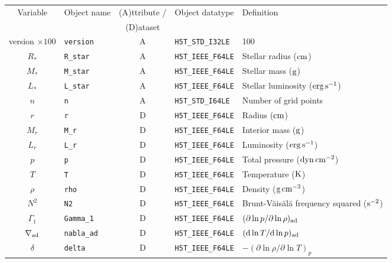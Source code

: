 \documentclass{article}
\newcommand{\diff}{\ensuremath{{\rm d}}}
\newcommand{\Rstar}{\ensuremath{R_{\ast}}}
\newcommand{\Mstar}{\ensuremath{M_{\ast}}}
\newcommand{\Lstar}{\ensuremath{L_{\ast}}}
\newcommand{\cm}{\ensuremath{{\rm cm}}}
\newcommand{\gram}{\ensuremath{{\rm g}}}
\newcommand{\second}{\ensuremath{{\rm s}}}
\newcommand{\dyne}{\ensuremath{{\rm dyn}}}
\newcommand{\erg}{\ensuremath{{\rm erg}}}
\newcommand{\kelvin}{\ensuremath{{\rm K}}}
\begin{document}
\begin{table}[h!]
\begin{tabular}{|c|l|c|l|l|} \hline
Variable & Object name & (A)ttribute / & Object datatype & Definition \\
&             & (D)ataset     &                 &            \\ \hline
version $\times 100$ & \texttt{version}   & A & \texttt{H5T\_STD\_I32LE}  & 100 \\
\Rstar            & \texttt{R\_star}      & A & \texttt{H5T\_IEEE\_F64LE} & Stellar radius ($\cm$) \\
\Mstar            & \texttt{M\_star}      & A & \texttt{H5T\_IEEE\_F64LE} & Stellar mass ($\gram$) \\
\Lstar            & \texttt{L\_star}      & A & \texttt{H5T\_IEEE\_F64LE} & Stellar luminosity ($\erg\,\second^{-1}$) \\
$n$               & \texttt{n}            & A &\texttt{H5T\_STD\_I64LE}  & Number of grid points \\ 
$r$               & \texttt{r}            & D & \texttt{H5T\_IEEE\_F64LE} & Radius ($\cm$) \\
$M_{r}$           & \texttt{M\_r}            & D & \texttt{H5T\_IEEE\_F64LE} & Interior mass ($\gram$) \\
$L_{r}$           & \texttt{L\_r}         & D & \texttt{H5T\_IEEE\_F64LE} & Luminosity ($\erg\,\second^{-1}$) \\
$p$               & \texttt{p}            & D & \texttt{H5T\_IEEE\_F64LE} & Total pressure ($\dyne\,\cm^{-2}$) \\
$T$               & \texttt{T}            & D & \texttt{H5T\_IEEE\_F64LE} & Temperature ($\kelvin$) \\
$\rho$            & \texttt{rho}          & D & \texttt{H5T\_IEEE\_F64LE} & Density ($\gram\,\cm^{-3}$) \\
$N^{2}$           & \texttt{N2}           & D & \texttt{H5T\_IEEE\_F64LE} & Brunt-V\"ais\"al\"a frequency squared ($\second^{-2}$) \\
$\Gamma_{1}$      & \texttt{Gamma\_1}      & D & \texttt{H5T\_IEEE\_F64LE} & $(\partial \ln p/\partial \ln \rho)_{\rm ad}$ \\
$\nabla_{\rm ad}$  & \texttt{nabla\_ad}      & D & \texttt{H5T\_IEEE\_F64LE} & $(\diff \ln T/\diff \ln p)_{\rm ad}$ \\
$\delta$      & \texttt{delta}            & D & \texttt{H5T\_IEEE\_F64LE} & $-(\partial \ln \rho/\partial \ln T)_{p}$  \\

\end{tabular}
\end{table}
\end{document}
